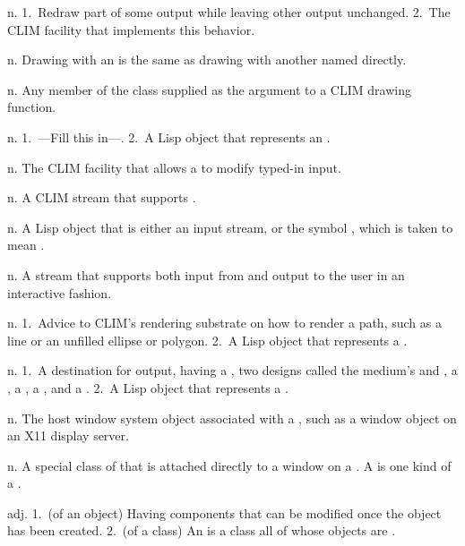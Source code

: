 \begin{description}
 {n.} {1.~Redraw part of some output while
leaving other output unchanged.  2.~The CLIM facility that implements this
behavior.}

 {n.} {Drawing with an  is the
same as drawing with another  named directly.}

 {n.} {Any member of the class  supplied as the
 argument to a CLIM drawing function.}

 {n.} {1.~---Fill this in---.  2.~A Lisp object
that represents an .}

 {n.} {The CLIM facility that allows a 
to modify typed-in input.}

 {n.} {A CLIM stream that supports
.}

 {n.} {A Lisp object that is either an
input stream, or the symbol , which is taken to mean .}

 {n.} {A stream that supports both input from
and output to the user in an interactive fashion.}

 {n.} {1.~Advice to CLIM's rendering substrate on how
to render a path, such as a line or an unfilled ellipse or polygon.  2.~A Lisp
object that represents a .}

 {n.} {1.~A destination for output, having a
, two designs called the medium's  and
, a , a , a
, and a .  2.~A Lisp object that represents a
.}

 {n.} {The host window system object associated with a
, such as a window object on an X11 display server.}

 {n.} {A special class of  that is
attached directly to a window on a .  A  is one
kind of a .}

 {adj.} {1.~(of an object) Having components that can be
modified once the object has been created.  2.~(of a class) An  is a class all of whose objects are .}


\end{description}
